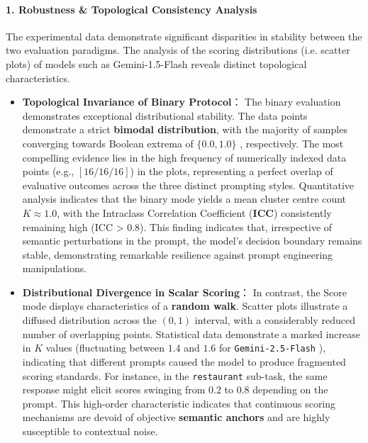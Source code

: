 \paragraph{1. Robustness \& Topological Consistency Analysis}
The experimental data demonstrate significant disparities in stability between the two evaluation paradigms. The analysis of the scoring distributions (i.e. scatter plots) of models such as Gemini-1.5-Flash reveals distinct topological characteristics.
\begin{itemize}
\item \textbf{Topological Invariance of Binary Protocol}：
The binary evaluation demonstrates exceptional distributional stability. The data points demonstrate a strict \textbf{bimodal distribution}, with the majority of samples converging towards Boolean extrema of $\{0.0, 1.0\}$ , respectively. The most compelling evidence lies in the high frequency of numerically indexed data points (e.g., $[16/16/16]$) in the plots, representing a perfect overlap of evaluative outcomes across the three distinct prompting styles. Quantitative analysis indicates that the binary mode yields a mean cluster centre count$K \approx 1.0$, with the Intraclass Correlation Coefficient (\textbf{ICC}) consistently remaining high (ICC > 0.8). This finding indicates that, irrespective of semantic perturbations in the prompt, the model's decision boundary remains stable, demonstrating remarkable resilience against prompt engineering manipulations.

\item \textbf{Distributional Divergence in Scalar Scoring}：
In contrast, the Score mode displays characteristics of a \textbf{random walk}. Scatter plots illustrate a diffused distribution across the $(0, 1)$ interval, with a considerably reduced number of overlapping points. Statistical data demonstrate a marked increase in $K$ values (fluctuating between $1.4$ and $1.6$ for \texttt{Gemini-2.5-Flash} ), indicating that different prompts caused the model to produce fragmented scoring standards. For instance, in the \texttt{restaurant} sub-task, the same response might elicit scores swinging from $0.2$ to $0.8$ depending on the prompt. This high-order characteristic indicates that continuous scoring mechanisms are devoid of objective \textbf{semantic anchors} and are highly susceptible to contextual noise.
\end{itemize}

